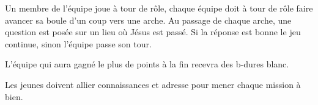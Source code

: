 \documentclass{grand-jeu}
\begin{document}
\begin{liste-materiel}
\end{liste-materiel}

\begin{regles}
Un membre de l'équipe joue à tour de rôle, chaque équipe doit à tour de rôle faire avancer sa boule d'un coup vers une arche. Au passage de chaque arche, une question est posée sur un lieu où Jésus est passé. Si la réponse est bonne le jeu continue, sinon l'équipe passe son tour.

L’équipe qui aura gagné le plus de points à la fin recevra des b-dures blanc.
\end{regles}

\begin{imaginaire}
Les jeunes doivent allier connaissances et adresse pour mener chaque mission à bien. 
\end{imaginaire}

\begin{moments-stop}
\end{moments-stop}
\end{document}
